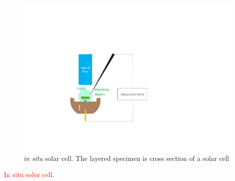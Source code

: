 \begin{figure}  
\includegraphics[height=\textwidth, angle=-90]{figures/figure7_sc}
\caption[Solar cell.]{\textit{in situ} solar cell. The layered specimen is cross section of a solar cell
\label{fig:2_apply}}
\end{figure}

\textcolor{red}{In situ solor cell}. 


